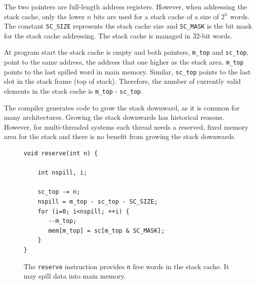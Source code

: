 \documentclass[a4paper,fontsize=10pt,twoside,DIV15,BCOR12mm,headinclude=true,footinclude=false,pagesize,bibtotoc]{scrbook}
\newcommand{\code}[1]{{\texttt{#1}}}
\begin{document}
The two pointers are full-length address registers. However,
when addressing the stack cache, only the lower $n$ bits
are used for a stack cache of a size of $2^n$ words.
The constant \code{SC\_SIZE} represents the stack
cache size and \code{SC\_MASK} is the bit mask for
the stack cache addressing. The stack cache is managed in 32-bit
words. %

At program start the stack cache is empty and both pointers,
\code{m\_top} and \code{sc\_top}, point to the same address,
the address that one higher as the stack area. \code{m\_top}
points to the last spilled word in main memory.
Similar, \code{sc\_top} points to the last slot in the stack
frame (top of stack). Therefore, the number of currently valid
elements in the stack cache is \code{m\_top} - \code{sc\_top}.

The compiler generates code to grow the stack downward,
as it is common for many architectures. Growing the stack downwards
has historical reasons. However, for multi-threaded
systems each thread needs a reserved, fixed memory area
for the stack and there is no benefit from growing the stack
downwards.

%
%
%
%
%
%

\begin{figure}
\begin{lstlisting}
void reserve(int n) {

    int nspill, i;

    sc_top -= n;
    nspill = m_top - sc_top - SC_SIZE;
    for (i=0; i<nspill; ++i) {
       --m_top;
       mem[m_top] = sc[m_top & SC_MASK];
    }
}
	\end{lstlisting}
 	 \caption{The \code{reserve} instruction provides \code{n}
	 free words in the stack cache. It may spill data into main memory.}
 	 \label{fig:res_iml}
\end{figure}
\end{document}
